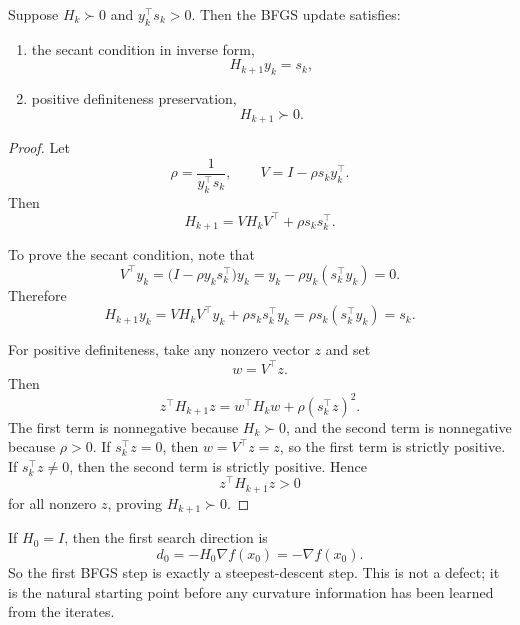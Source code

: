 \begin{algorithm}[H]
	\DontPrintSemicolon
	\caption{BFGS with Line Search}
\label{alg:l2-bfgs-with-line-search}
\end{algorithm}

\begin{theorem}\label{thm:l2-two-basic-bfgs-properties}
	Suppose $H_k \succ 0$ and $y_k^\top s_k>0$. Then the BFGS update satisfies:
	\begin{enumerate}[label=(\roman*)]
		\item the secant condition in inverse form,
		      \[
			      H_{k+1}y_k=s_k,
		      \]
		\item positive definiteness preservation,
		      \[
			      H_{k+1}\succ 0.
		      \]
	\end{enumerate}
\end{theorem}
\begin{proof}
	Let
	\[
		\rho=\frac{1}{y_k^\top s_k},
		\qquad
		V=I-\rho s_k y_k^\top.
	\]
	Then
	\[
		H_{k+1}=V H_k V^\top + \rho s_k s_k^\top.
	\]

	To prove the secant condition, note that
	\[
		V^\top y_k
		=
		\bigl(I-\rho y_k s_k^\top\bigr)y_k
		=
		y_k-\rho y_k (s_k^\top y_k)
		=
		0.
	\]
	Therefore
	\[
		H_{k+1}y_k = V H_k V^\top y_k + \rho s_k s_k^\top y_k = \rho s_k (s_k^\top y_k)=s_k.
	\]

	For positive definiteness, take any nonzero vector $z$ and set
	\[
		w=V^\top z.
	\]
	Then
	\[
		z^\top H_{k+1} z
		=
		w^\top H_k w + \rho (s_k^\top z)^2.
	\]
	The first term is nonnegative because $H_k\succ 0$, and the second term is nonnegative because $\rho>0$. If $s_k^\top z=0$, then $w=V^\top z=z$, so the first term is strictly positive. If $s_k^\top z\neq 0$, then the second term is strictly positive. Hence
	\[
		z^\top H_{k+1} z>0
	\]
	for all nonzero $z$, proving $H_{k+1}\succ 0$.
\end{proof}

\begin{remark}
	If $H_0=I$, then the first search direction is
	\[
		d_0=-H_0 \nabla f(x_0)=-\nabla f(x_0).
	\]
	So the first BFGS step is exactly a steepest-descent step. This is not a defect; it is the natural starting point before any curvature information has been learned from the iterates.
\end{remark}

